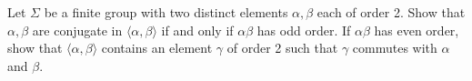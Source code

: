 Let $\Sigma$ be a finite group with two distinct elements $\alpha, \beta$ each of order 2. Show that $\alpha, \beta$ are conjugate in $\langle\alpha,\beta\rangle$ if and only if $\alpha\beta$ has odd order. If $\alpha\beta$ has even order, show that $\langle\alpha,\beta\rangle$ contains an element $\gamma$ of order 2 such that $\gamma$ commutes with $\alpha$ and $\beta$.
